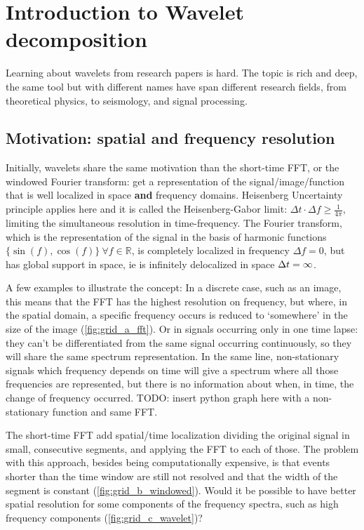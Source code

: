 \documentclass{InsightArticle}
\theoremstyle{definition}
\newcommand{\IJhandlerIDnumber}{3558}
\begin{document}
\IJhandlenote{\IJhandlerIDnumber}

\tableofcontents

\section{Introduction to Wavelet decomposition}
\label{sec:Intro}
Learning about wavelets from research papers is hard. The topic is rich and deep, the same tool but with different names have span different research fields, from theoretical physics, to seismology, and signal processing.

\subsection{Motivation: spatial and frequency resolution}
\label{sub:Motivation}
Initially, wavelets share the same motivation than the short-time FFT, or the windowed Fourier transform: get a representation of the signal/image/function that is well localized in space \textbf{and} frequency domains. Heisenberg Uncertainty principle applies here and it is called the Heisenberg-Gabor limit: $\Delta t \cdot \Delta f \geq \frac{1}{4\pi}$, limiting the simultaneous resolution in time-frequency.
The Fourier transform, which is the representation of the signal in the basis of harmonic functions $\{\sin(f),\cos(f)\}\ \forall f \in \mathbb{R}$, is completely localized in frequency $\Delta f = 0$, but has global support in space, ie is infinitely delocalized in space $\Delta t = \infty$.

A few examples to illustrate the concept: In a discrete case, such as an image, this means that the FFT has the highest resolution on frequency, but where, in the spatial domain, a specific frequency occurs is reduced to `somewhere' in the size of the image (\autoref{fig:grid_a_fft}).
Or in signals occurring only in one time lapse: they can't be differentiated from the same signal occurring continuously, so they will share the same spectrum representation. In the same line, non-stationary signals which frequency depends on time will give a spectrum where all those frequencies are represented, but there is no information about when, in time, the change of frequency occurred.  TODO: insert python graph here with a non-stationary function and same FFT.

The short-time FFT add spatial/time localization dividing the original signal in small, consecutive segments, and applying the FFT to each of those. The problem with this approach, besides being computationally expensive, is that events shorter than the time window are still not resolved and that the width of the segment is constant (\autoref{fig:grid_b_windowed}). Would it be possible to have better spatial resolution for some components of the frequency spectra, such as high frequency components (\autoref{fig:grid_c_wavelet})?
\end{document}
